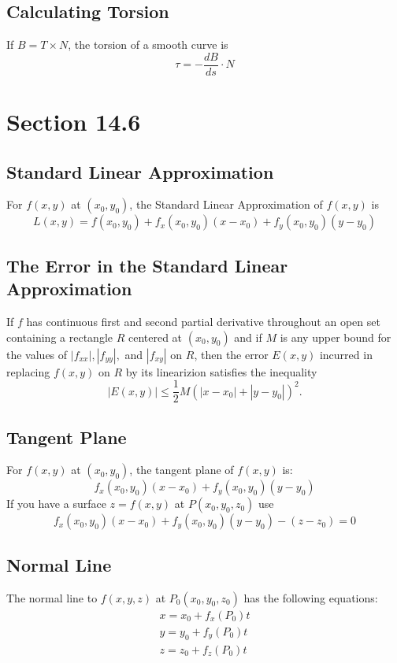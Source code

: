 \documentclass[12pt]{article}
\theoremstyle{break}
\numberwithin{theorem}{subsection}
\numberwithin{lemma}{subsection}
\numberwithin{corollary}{subsection}
\numberwithin{equation}{subsection}
\begin{document}
\subsection{Calculating Torsion}
If $B = T \times N$, the torsion of a smooth curve is 
\begin{equation*}
\tau = - \frac{dB}{ds} \cdot N
\end{equation*}

\section{Section 14.6}

\subsection{Standard Linear Approximation}
For $f(x,y)$ at $(x_0, y_0)$, the Standard Linear Approximation of $f(x,y)$ is 
\begin{equation} 
L(x,y) = f(x_0,y_0) + f_x(x_0,y_0)(x-x_0) + f_y(x_0,y_0)(y-y_0) 
\end{equation}

\subsection{The Error in the Standard Linear Approximation}
If $f$ has continuous first and second partial derivative throughout an open set containing a 
rectangle $R$ centered at $(x_0, y_0)$ and if $M$ is any upper bound for the values of $|f_{xx}|,
|f_{yy}|,$ and $|f_{xy}|$ on $R$, then the error $E(x,y)$ incurred in replacing $f(x,y)$ on $R$ by
its linearizion satisfies the inequality
\begin{equation}
|E(x,y)| \leq \frac12 M(|x-x_0| + |y-y_0|)^2 .
\end{equation}

\subsection{Tangent Plane}
For $f(x,y)$ at $(x_0, y_0)$, the tangent plane of $f(x,y)$ is:
\begin{equation} 
f_x(x_0,y_0)(x-x_0) + f_y(x_0,y_0)(y-y_0) 
\end{equation}
If you have a surface $z = f(x,y)$ at $P(x_0,y_0,z_0)$ use 
\begin{equation}
f_x(x_0,y_0)(x-x_0) + f_y(x_0,y_0)(y-y_0) - (z-z_0) = 0
\end{equation}

\subsection{Normal Line}
The normal line to $f(x,y,z)$ at $P_0 (x_0,y_0,z_0)$ has the following equations:
\begin{align*}
x = x_0 + f_x(P_0)t \\
y = y_0 + f_y(P_0)t \\
z = z_0 + f_z(P_0)t \\
\end{align*}
\end{document}
